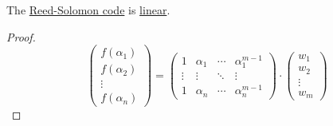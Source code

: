 \begin{proposition}\label{thm:reed_solomon_linearity}
  The \hyperref[alg:reed_solomon_code]{Reed-Solomon code} is \hyperref[def:error_correcting_code/linear]{linear}.
\end{proposition}
\begin{proof}
  \begin{equation*}
    \begin{pmatrix}
      f(\alpha_1) \\
      f(\alpha_2) \\
      \vdots \\
      f(\alpha_n)
    \end{pmatrix}
    =
    \begin{pmatrix}
      1      & \alpha_1 & \cdots & \alpha_1^{m-1} \\
      \vdots & \vdots   & \ddots & \vdots \\
      1      & \alpha_n & \cdots & \alpha_n^{m-1}
    \end{pmatrix}
    \cdot
    \begin{pmatrix}
      w_1 \\
      w_2 \\
      \vdots \\
      w_m
    \end{pmatrix}
  \end{equation*}
\end{proof}

